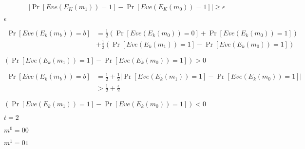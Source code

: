 \documentclass[10pt]{book}
\begin{document}
\begin{mdSnippets}
\begin{mdDisplaySnippet}%
\[%
|\Pr[Eve(E_K(m_1)) = 1] - \Pr[Eve(E_K(m_0)) = 1]| \geq \epsilon
\]%
\end{mdDisplaySnippet}%
\begin{mdInlineSnippet}[92e4da341fe8f4cd46192f21b6ff3aa7]%
$\epsilon$\end{mdInlineSnippet}%
\begin{mdDisplaySnippet}%
\[%
\begin{aligned}
\Pr[Eve(E_k(m_b)) = b] &= \frac{1}{2} (\Pr[Eve(E_k(m_0)) = 0] + \Pr[Eve(E_k(m_0)) = 1]) \\
&+\frac{1}{2}(\Pr[Eve(E_k(m_1)) = 1] - \Pr[Eve(E_k(m_0)) = 1])
\end{aligned}
\]%
\end{mdDisplaySnippet}%
\begin{mdInlineSnippet}[65ba5e0889a4591133ec113b59f366f7]%
$(\Pr[Eve(E_k(m_1)) = 1] - \Pr[Eve(E_k(m_0)) = 1]) > 0$\end{mdInlineSnippet}%
\begin{mdDisplaySnippet}[944f0952a7259003307f6b254b48830d]%
\[%
\begin{aligned}
\Pr[Eve(E_k(m_b)) = b] &= \frac{1}{2} + \frac{1}{2}|\Pr[Eve(E_k(m_1)) = 1] - \Pr[Eve(E_k(m_0)) = 1]| \\
&> \frac{1}{2} + \frac{\epsilon}{2} 
\end{aligned}
\]%
\end{mdDisplaySnippet}%
\begin{mdInlineSnippet}[e0a1bd7b389e6796ec36892d797871ad]%
$(\Pr[Eve(E_k(m_1)) = 1] - \Pr[Eve(E_k(m_0)) = 1]) < 0$\end{mdInlineSnippet}%
\begin{mdInlineSnippet}[b0af76257fd334f5200fa9c2a421688a]%
$t=2$\end{mdInlineSnippet}%
\begin{mdInlineSnippet}[bb5422374817969af549253607d8f219]%
$m^0 = 00$\end{mdInlineSnippet}%
\begin{mdInlineSnippet}%
$m^1 = 01$\end{mdInlineSnippet}%

\end{mdSnippets}
\end{document}

